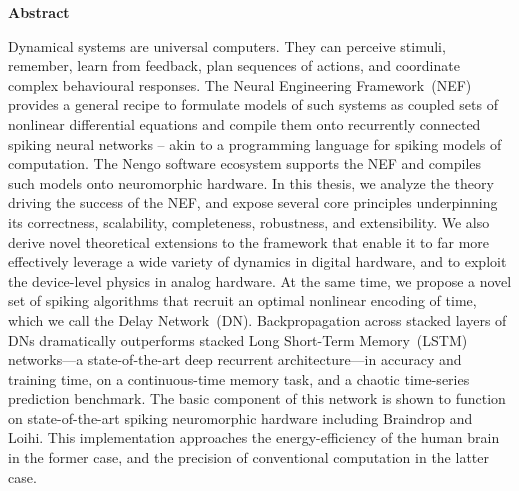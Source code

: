 \begin{center}\textbf{Abstract}\end{center}

\noindent
Dynamical systems are universal computers. They can perceive stimuli, remember, learn from feedback, plan sequences of actions, and coordinate complex behavioural responses.
The Neural Engineering Framework~(NEF) provides a general recipe to formulate models of such systems
as coupled sets of nonlinear differential equations and compile them onto recurrently connected spiking neural networks -- akin to a programming language for spiking models of computation.
The Nengo software ecosystem supports the NEF and compiles such models onto neuromorphic hardware.
In this thesis, we analyze the theory driving the success of the NEF, and expose several core principles underpinning its correctness, scalability, completeness, robustness, and extensibility.
We also derive novel theoretical extensions to the framework that enable it to far more effectively leverage a wide variety of dynamics in digital hardware, and to exploit the device-level physics in analog hardware.
At the same time, we propose a novel set of spiking algorithms that recruit an optimal nonlinear
 encoding of time, which we call the Delay Network~(DN).
Backpropagation across stacked layers of DNs dramatically outperforms stacked Long Short-Term Memory~(LSTM) networks---a state-of-the-art deep recurrent architecture---in accuracy and training time, on a
 continuous-time memory task, and a chaotic time-series prediction benchmark.
The basic component of this network is shown to function on state-of-the-art spiking neuromorphic
 hardware including Braindrop and Loihi.
This implementation approaches the energy-efficiency of the human brain in the former case, and the precision of conventional computation in the latter case.

\cleardoublepage
